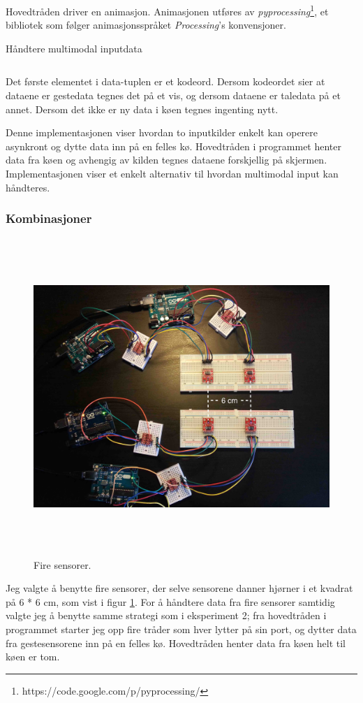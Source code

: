Hovedtråden driver en animasjon. Animasjonen utføres av \emph{pyprocessing}\footnote{https://code.google.com/p/pyprocessing/}, et bibliotek som følger animasjonsspråket \emph{Processing}'s konvensjoner.
\begin{listing}[ht]
\caption{Håndtere multimodal inputdata}
\inputminted[fontsize=\footnotesize, linenos]{python}{kodesnutter/multimodal.py}
\label{code:multimodal}
\end{listing}
Det første elementet i data-tuplen er et kodeord. Dersom kodeordet sier at dataene er gestedata tegnes det på et vis, og dersom dataene er taledata på et annet. Dersom det ikke er ny data i køen tegnes ingenting nytt.

Denne implementasjonen viser hvordan to inputkilder enkelt kan operere asynkront og dytte data inn på en felles kø. Hovedtråden i programmet henter data fra køen og avhengig av kilden tegnes dataene forskjellig på skjermen. Implementasjonen viser et enkelt alternativ til hvordan multimodal input kan håndteres.\\

\subsubsection{Kombinasjoner}
\begin{figure}[h]
\centering
\includegraphics[width=15cm, height=12cm]{fig/foursensors}
\caption{Fire sensorer.}
\label{fig:four-sensors}
\end{figure}
Jeg valgte å benytte fire sensorer, der selve sensorene danner hjørner i et kvadrat på 6 * 6 cm, som vist i figur \ref{fig:four-sensors}.
For å håndtere data fra fire sensorer samtidig valgte jeg å benytte samme strategi som i eksperiment 2; fra hovedtråden i programmet starter jeg opp fire tråder som hver lytter på sin port, og dytter data fra gestesensorene inn på en felles kø. Hovedtråden henter data fra køen helt til køen er tom.

